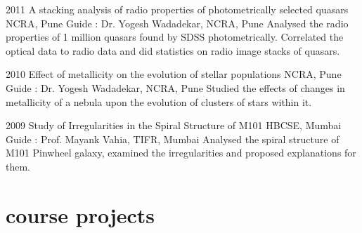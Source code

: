 \documentclass[11pt,print]{friggeri-cv}%
\begin{document}
    \begin{entrylist}


  \entry
    {2011}
    {A stacking analysis of radio properties of photometrically selected quasars}
    {NCRA, Pune}
    {
    Guide : Dr. Yogesh Wadadekar, NCRA, Pune}
    {Analysed the radio properties of 1 million quasars found by SDSS photometrically. Correlated the optical data to radio data and did statistics on radio image stacks of quasars.
    }
    \end{entrylist}
    \begin{entrylist}
  \entry
    {2010}
    {Effect of metallicity on the evolution of stellar populations}
    {NCRA, Pune}
    {
    Guide : Dr. Yogesh Wadadekar, NCRA, Pune}
    {Studied the effects of changes in metallicity of a nebula upon the evolution of clusters of stars within it.
    }

    \end{entrylist}
\begin{entrylist}
  \entry
    {2009}
    {Study of Irregularities in the Spiral Structure of M101}
    {HBCSE, Mumbai}
    {
    Guide : Prof. Mayank Vahia, TIFR, Mumbai}
    {Analysed the spiral structure of M101 Pinwheel galaxy, examined the irregularities  and proposed explanations for them. 
    }    
\end{entrylist}

\section{course projects}
\end{document}
